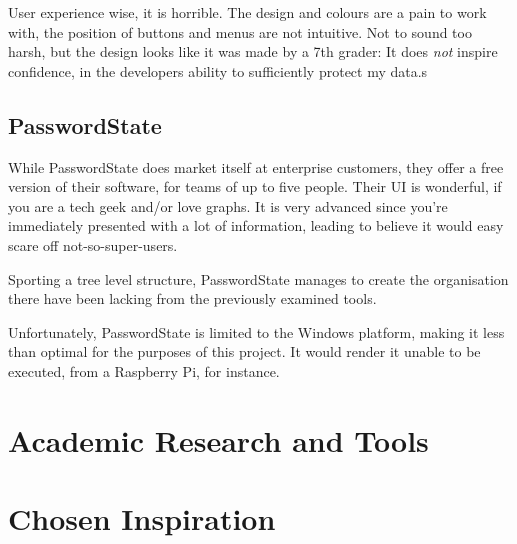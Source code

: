 			User experience wise, it is horrible. The design and colours are a pain to work with, the position of buttons and menus are not intuitive. Not to sound too harsh, but the design looks like it was made by a 7th grader: It does \emph{not} inspire confidence, in the developers ability to sufficiently protect my data.s

		\subsection{PasswordState}
			While PasswordState does market itself at enterprise customers, they offer a free version of their software, for teams of up to five people. Their UI is wonderful, if you are a tech geek and/or love graphs. It is very advanced since you're immediately presented with a lot of information, leading to believe it would easy scare off not-so-super-users.

			Sporting a tree level structure, PasswordState manages to create the organisation there have been lacking from the previously examined tools.

			Unfortunately, PasswordState is limited to the Windows platform, making it less than optimal for the purposes of this project. It would render it unable to be executed, from a Raspberry Pi, for instance.







	\section{Academic Research and Tools}
	\section{Chosen Inspiration}